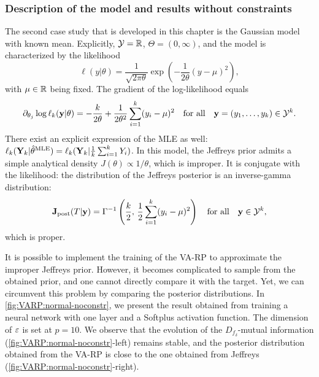\subsubsection{Description of the model and results without constraints}

The second case study that is developed in this chapter is the Gaussian model with known mean. Explicitly, $\mathcal{Y}=\mathbb{R}$, $\Theta=(0,\infty)$, and the model is characterized by the likelihood 
\begin{equation}
    \ell(y|\theta) = \frac{1}{\sqrt{2\pi\theta}}\exp\left(-\frac{1}{2\theta}(y-\mu)^2\right),
\end{equation}
with $\mu\in\mathbb{R}$ being fixed. The gradient of the log-likelihood equals
\begin{equation}
    \partial_{\theta_j}\log\ell_k(\mathbf{y}|\theta) = -\frac{k}{2\theta}+\frac{1}{2\theta^2}\sum_{i=1}^k(y_i-\mu)^2\quad\text{for all}\quad \mathbf{y}=(y_1,\dots,y_k)\in\mathcal{Y}^k.
\end{equation}
There exist an explicit expression of the  MLE as well: $\ell_k(\mathbf{Y}_k|\hat\theta^{\text{MLE}})= \ell_k(\mathbf{Y}_k|\frac{1}{k}\sum_{i=1}^kY_i)$. In this model, the Jeffreys prior admits a simple analytical density $J(\theta)\propto1/\theta$, which is improper. 
It is conjugate with the likelihood: the distribution of the Jeffreys posterior is an inverse-gamma distribution:
    \begin{equation}
        \mathbf{J}_{\text{post}}(T|\mathbf{y}) = \Gamma^{-1}\left(\frac{k}{2},\,\frac{1}{2}\sum_{i=1}^{k}(y_i-\mu)^2\right)    \quad\text{for all}\quad \mathbf{y}\in\mathcal{Y}^k,
    \end{equation}
which is proper.

It is possible to implement the training of the VA-RP to approximate the improper Jeffreys prior. However, it becomes complicated to sample from the obtained prior, and one cannot directly compare it with the target. 
Yet, we can circumvent this problem by comparing the posterior distributions.
In \cref{fig:VARP:normal-noconstr}, we present the result obtained from training a neural network with one layer and a Softplus activation function. The dimension of $\varepsilon$ is set at $p=10$.
We observe that the evolution of the $D_{f_\delta}$-mutual information (\cref{fig:VARP:normal-noconstr}-left) remains stable, and the posterior distribution obtained from the VA-RP is close to the one obtained from Jeffreys (\cref{fig:VARP:normal-noconstr}-right).

